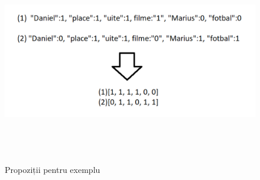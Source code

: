 		\begin{figure}[htbp]
			\centerline{\includegraphics[width=16cm, height=9cm]{figures/rezultat vectori.png}}
			\caption{Propoziții pentru exemplu}
			\label{fig}
		\end{figure}

